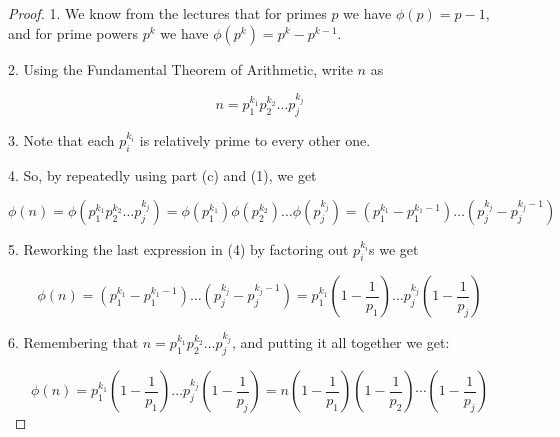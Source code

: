 \documentclass[14pt]{extarticle}
\begin{document}
\begin{proof}
1. We know from the lectures that for primes $p$ we have $\phi(p) = p-1$, and for prime powers $p^k$ we have $\phi(p^k) = p^k - p^{k-1}$.

2. Using the Fundamental Theorem of Arithmetic, write $n$ as

$$
n = p_1^{k_1}p_2^{k_2}\ldots p_j^{k_j}
$$

3. Note that each $p_i^{k_i}$ is relatively prime to every other one.

4. So, by repeatedly using part (c) and (1), we get

$$
\phi(n) = \phi(p_1^{k_1}p_2^{k_2}\ldots p_j^{k_j}) = \phi(p_1^{k_1})\phi(p_2^{k_2})\ldots \phi(p_j^{k_j}) = (p_1^{k_1} - p_1^{k_1-1}) \ldots (p_j^{k_j} - p_j^{k_j-1})
$$

5. Reworking the last expression in (4) by factoring out $p_i^{k_i}$s we get

$$
\phi(n) = (p_1^{k_1} - p_1^{k_1-1}) \ldots (p_j^{k_j} - p_j^{k_j-1}) = p_1^{k_1}\left(1 - \frac{1}{p_1}\right) \ldots p_j^{k_j}\left(1 - \frac{1}{p_j}\right)
$$

6. Remembering that $n = p_1^{k_1}p_2^{k_2}\ldots p_j^{k_j}$, and putting it all together we get:

$$
\phi(n) = p_1^{k_1}\left(1 - \frac{1}{p_1}\right) \ldots p_j^{k_j}\left(1 - \frac{1}{p_j}\right) = n\left(1 - \frac{1}{p_1}\right)\left(1 - \frac{1}{p_2}\right)\cdots\left(1 - \frac{1}{p_j}\right)
$$

\end{proof}
\end{document}
